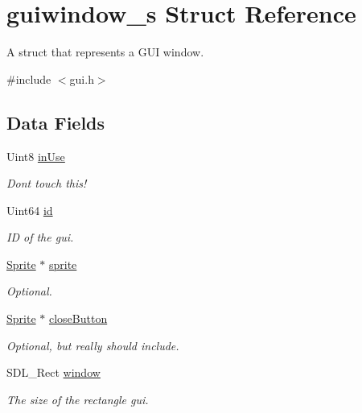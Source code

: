 \hypertarget{structguiwindow__s}{}\section{guiwindow\+\_\+s Struct Reference}
\label{structguiwindow__s}


A struct that represents a G\+UI window.  




{\ttfamily \#include $<$gui.\+h$>$}

\subsection*{Data Fields}
\begin{DoxyCompactItemize}
\item 
Uint8 \hyperlink{structguiwindow__s_a11061b5287f78ab2e0ceba22ecb7cb49}{in\+Use}
\begin{DoxyCompactList}\small\item\em Don\textquotesingle{}t touch this! \end{DoxyCompactList}\item 
Uint64 \hyperlink{structguiwindow__s_a4158e9a3af9337e59f9b8de984c0efba}{id}
\begin{DoxyCompactList}\small\item\em ID of the gui. \end{DoxyCompactList}\item 
\hyperlink{gf2d__sprite_8h_a85b5a622f08c587d1f33fd504a24416e}{Sprite} $\ast$ \hyperlink{structguiwindow__s_a7c54302f990f134ca6e37a2e9ef9999d}{sprite}
\begin{DoxyCompactList}\small\item\em Optional. \end{DoxyCompactList}\item 
\hyperlink{gf2d__sprite_8h_a85b5a622f08c587d1f33fd504a24416e}{Sprite} $\ast$ \hyperlink{structguiwindow__s_a56f2703799c6886a91f0c056eb583141}{close\+Button}
\begin{DoxyCompactList}\small\item\em Optional, but really should include. \end{DoxyCompactList}\item 
S\+D\+L\+\_\+\+Rect \hyperlink{structguiwindow__s_a919229fae17969e3b7654415a1ddfd06}{window}
\begin{DoxyCompactList}\small\item\em The size of the rectangle gui. \end{DoxyCompactList}\item 

\end{DoxyCompactItemize}
